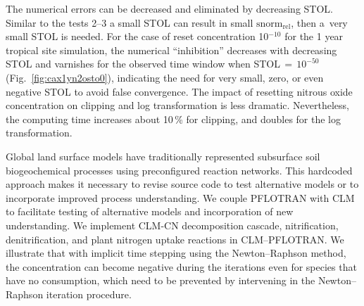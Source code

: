\documentclass[gmd,noline]{copernicus}
\begin{document}
      The numerical errors can be decreased and eliminated by decreasing
      STOL.  Similar to the tests 2--3 a
      small STOL can result in small $\text{snorm}_{\text{rel}}$, then
      a~very small STOL is needed. For the case of reset concentration
      10$^{-10}$ for the 1 year tropical site simulation, the numerical
      ``inhibition'' decreases with decreasing STOL and varnishes for the
      observed time window when STOL\,$=$\,$10^{-50}$
      (Fig.~\ref{fig:cax1yn2osto0}), indicating the need for very small,
      zero, or even negative STOL to avoid false convergence. The impact of
      resetting nitrous oxide concentration on clipping and log
      transformation is less dramatic. Nevertheless, the computing time
      increases about 10\,{\%} for clipping, and doubles for the log
      transformation.




      Global land surface models have traditionally represented subsurface
      soil biogeochemical processes using preconfigured reaction
      networks. This hardcoded approach makes it necessary to revise source
      code to test alternative models or to incorporate improved process
      understanding. We couple PFLOTRAN with CLM to facilitate testing of
      alternative models and incorporation of new understanding. We
      implement CLM-CN decomposition cascade, nitrification,
      denitrification, and plant nitrogen uptake reactions in
      CLM--PFLOTRAN. We illustrate that with implicit time stepping using the
      Newton--Raphson method, the concentration can become negative during
      the iterations even for species that have no consumption, which need
      to be prevented by intervening in the Newton--Raphson iteration
      procedure.
\end{document}
